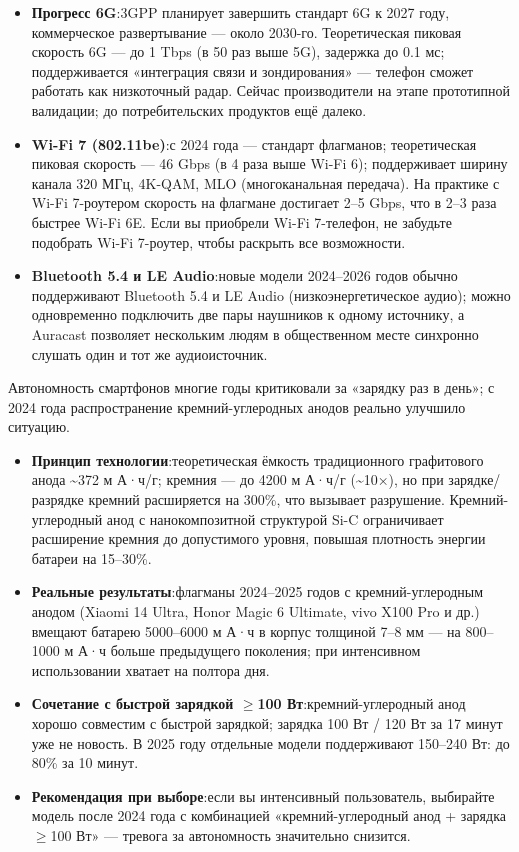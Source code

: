 \begin{itemize}
  \item \textbf{Прогресс 6G}:3GPP планирует завершить стандарт 6G к 2027 году, коммерческое развертывание — около 2030-го. Теоретическая пиковая скорость 6G — до 1 Tbps (в 50 раз выше 5G), задержка до 0.1 мс; поддерживается «интеграция связи и зондирования» — телефон сможет работать как низкоточный радар. Сейчас производители на этапе прототипной валидации; до потребительских продуктов ещё далеко.
  \item \textbf{Wi-Fi 7 (802.11be)}:с 2024 года — стандарт флагманов; теоретическая пиковая скорость — 46 Gbps (в 4 раза выше Wi-Fi 6); поддерживает ширину канала 320 МГц, 4K-QAM, MLO (многоканальная передача). На практике с Wi-Fi 7-роутером скорость на флагмане достигает 2–5 Gbps, что в 2–3 раза быстрее Wi-Fi 6E. Если вы приобрели Wi-Fi 7-телефон, не забудьте подобрать Wi-Fi 7-роутер, чтобы раскрыть все возможности.
  \item \textbf{Bluetooth 5.4 и LE Audio}:новые модели 2024–2026 годов обычно поддерживают Bluetooth 5.4 и LE Audio (низкоэнергетическое аудио); можно одновременно подключить две пары наушников к одному источнику, а Auracast позволяет нескольким людям в общественном месте синхронно слушать один и тот же аудиоисточник.
\end{itemize}


Автономность смартфонов многие годы критиковали за «зарядку раз в день»; с 2024 года распространение кремний-углеродных анодов реально улучшило ситуацию.

\begin{itemize}
  \item \textbf{Принцип технологии}:теоретическая ёмкость традиционного графитового анода \textasciitilde{}372 м А·ч/г; кремния — до 4200 м А·ч/г (\textasciitilde{}10×), но при зарядке/разрядке кремний расширяется на 300\%, что вызывает разрушение. Кремний-углеродный анод с нанокомпозитной структурой Si-C ограничивает расширение кремния до допустимого уровня, повышая плотность энергии батареи на 15–30\%.
  \item \textbf{Реальные результаты}:флагманы 2024–2025 годов с кремний-углеродным анодом (Xiaomi 14 Ultra, Honor Magic 6 Ultimate, vivo X100 Pro и др.) вмещают батарею 5000–6000 м А·ч в корпус толщиной 7–8 мм — на 800–1000 м А·ч больше предыдущего поколения; при интенсивном использовании хватает на полтора дня.
  \item \textbf{Сочетание с быстрой зарядкой $\geq$100 Вт}:кремний-углеродный анод хорошо совместим с быстрой зарядкой; зарядка 100 Вт / 120 Вт за 17 минут уже не новость. В 2025 году отдельные модели поддерживают 150–240 Вт: до 80\% за 10 минут.
  \item \textbf{Рекомендация при выборе}:если вы интенсивный пользователь, выбирайте модель после 2024 года с комбинацией «кремний-углеродный анод + зарядка $\geq$100 Вт» — тревога за автономность значительно снизится.
\end{itemize}

